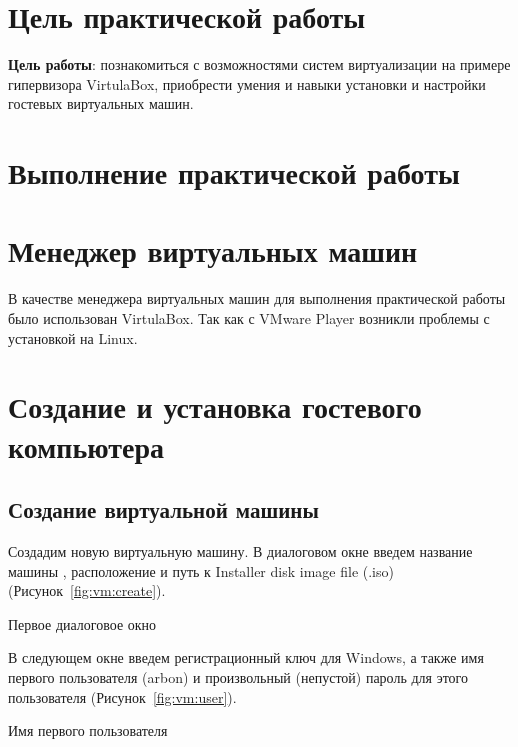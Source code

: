 \section*{\LARGE Цель практической работы}

\textbf{Цель работы}: познакомиться с возможностями систем виртуализации
на примере гипервизора VirtulaBox,
приобрести умения и навыки установки и настройки гостевых виртуальных машин.

\clearpage

\section*{\LARGE Выполнение практической работы}

\section{Менеджер виртуальных машин}

В качестве менеджера виртуальных машин для выполнения практической работы
было использован VirtulaBox. Так как с VMware Player возникли проблемы
с установкой на Linux.

\clearpage

\section{Создание и установка гостевого компьютера}

\subsection{Создание виртуальной машины}

Создадим новую виртуальную машину.
В диалоговом окне введем название машины
, расположение и путь к Installer disk image file (.iso)
(Рисунок~\ref{fig:vm:create}).

\begin{image}
	\caption{Первое диалоговое окно}
	\label{fig:vm:create}
\end{image}

В следующем окне введем регистрационный ключ для Windows, а также имя
первого пользователя (arbon) и произвольный (непустой) пароль
для этого пользователя (Рисунок~\ref{fig:vm:user}).

\begin{image}
	\caption{Имя первого пользователя}
	\label{fig:vm:user}
\end{image}

